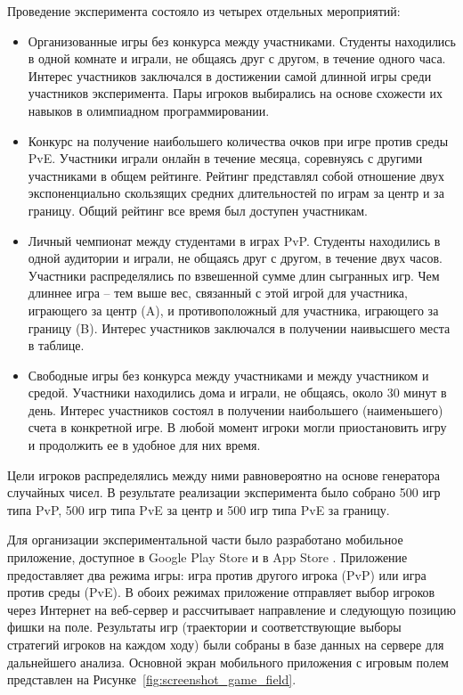 Проведение эксперимента состояло из четырех отдельных мероприятий:
\begin{itemize}
\item Организованные игры без конкурса между участниками. Студенты находились в одной комнате и играли, не общаясь друг с другом, в течение одного часа. Интерес участников заключался в достижении самой длинной игры среди участников эксперимента. Пары игроков выбирались на основе схожести их навыков в олимпиадном программировании.
\item Конкурс на получение наибольшего количества очков при игре против среды PvE. Участники играли онлайн в течение месяца, соревнуясь с другими участниками в общем рейтинге. Рейтинг представлял собой отношение двух экспоненциально скользящих средних длительностей по играм за центр и за границу. Общий рейтинг все время был доступен участникам.
\item Личный чемпионат между студентами в играх PvP. Студенты находились в одной аудитории и играли, не общаясь друг с другом, в течение двух часов. Участники распределялись по взвешенной сумме длин сыгранных игр. Чем длиннее игра -- тем выше вес, связанный с этой игрой для участника, играющего за центр (A), и противоположный для участника, играющего за границу (B). Интерес участников заключался в получении наивысшего места в таблице.
\item Свободные игры без конкурса между участниками и между участником и средой. Участники находились дома и играли, не общаясь, около 30 минут в день. Интерес участников состоял в получении наибольшего (наименьшего) счета в конкретной игре. В любой момент игроки могли приостановить игру и продолжить ее в удобное для них время.
\end{itemize}

Цели игроков распределялись между ними равновероятно на основе генератора случайных чисел. В результате реализации эксперимента было собрано 500 игр типа PvP, 500 игр типа PvE за центр и 500 игр типа PvE за границу.

Для организации экспериментальной части было разработано мобильное приложение, доступное в Google Play Store \cite{googleplay} и в App Store \cite{applestore}. Приложение предоставляет два режима игры: игра против другого игрока (PvP) или игра против среды (PvE). В обоих режимах приложение отправляет выбор игроков через Интернет на веб-сервер и рассчитывает направление и следующую позицию фишки на поле. Результаты игр (траектории и соответствующие выборы стратегий игроков на каждом ходу) были собраны в базе данных на сервере для дальнейшего анализа. Основной экран мобильного приложения с игровым полем представлен на Рисунке~\cref{fig:screenshot_game_field}.

